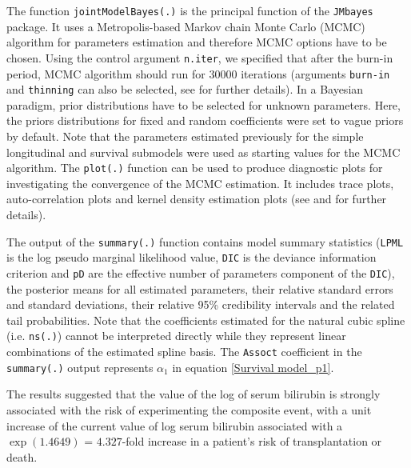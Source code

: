 \documentclass[12pt]{article}
\begin{document}
The function \texttt{jointModelBayes(.)} is the principal function of the \texttt{JMbayes} package. It uses a Metropolis-based Markov chain Monte Carlo (MCMC) algorithm for parameters estimation and therefore MCMC options have to be chosen. Using the control argument \texttt{n.iter}, we specified that after the burn-in period, MCMC algorithm should run for $30000$ iterations (arguments \texttt{burn-in} and \texttt{thinning} can also be selected, see \cite{JMbayes} for further details).
In a Bayesian paradigm, prior distributions have to be selected for unknown parameters. Here, the priors distributions for fixed and random coefficients were set to vague priors by default. Note that the parameters estimated previously for the simple longitudinal and survival submodels were used as starting values for the MCMC algorithm. The \texttt{plot(.)} function can be used to produce diagnostic plots for investigating the convergence of the MCMC estimation. It includes trace plots, auto-correlation plots and kernel density estimation plots (see \cite{JMbayes} and \cite{rizopoulos2017package} for further details).

The output of the \texttt{summary(.)} function contains model summary statistics (\texttt{LPML} is the log pseudo marginal likelihood value, \texttt{DIC} is the deviance information criterion and \texttt{pD} are the effective number of parameters component of the \texttt{DIC}), the posterior means for all estimated parameters, their relative standard errors and standard deviations, their relative 95\% credibility intervals and the related tail probabilities. Note that the coefficients estimated for the natural cubic spline (i.e. \texttt{ns(.)}) cannot be interpreted directly while they represent linear combinations of the estimated spline basis. The \texttt{Assoct} coefficient in the \texttt{summary(.)} output represents $\alpha_1$ in equation \eqref{Survival model_p1}.

The results suggested that the value of the log of serum bilirubin is strongly associated with the risk of experimenting the composite event, with a unit increase of the current value of log serum bilirubin associated with a $\exp(1.4649)$ = $4.327$-fold increase in a patient's risk of transplantation or death. 
\end{document}
